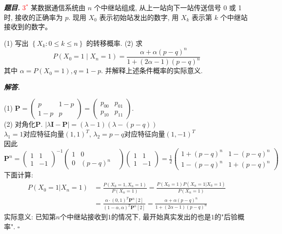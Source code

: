 \documentclass[10pt, a4paper, oneside]{ctexart}
\newenvironment{problem}{\begin{framed}\par\noindent\textbf{\textit{题目. }}}{\end{framed}\par}
\newenvironment{solution}{%
  \par\noindent\textbf{\textit{解答. }}\ignorespaces
}{%
  \hfill\ensuremath{\square}\par %
}
\begin{document}
\begin{problem}
\textcolor{red}{3$^*$} 某数据通信系统由 $n$ 个中继站组成, 从上一站向下一站传送信号 0 或 1 时, 接收的正确率为 $p$. 现用 $X_0$ 表示初始站发出的数字, 用 $X_k$ 表示第 $k$ 个中继站接收到的数字。

(1) 写出 $\left\{X_k: 0 \leqslant k \leqslant n\right\}$ 的转移概率.
(2) 求
$$
P\left(X_0=1 \mid X_n=1\right)=\frac{\alpha+\alpha(p-q)^n}{1+(2 \alpha-1)(p-q)^n}
$$
其中 $\alpha=P\left(X_0=1\right), q=1-p$. 并解释上述条件概率的实际意义.
\end{problem}

\begin{solution}
(1) $\mathbf{P}=\begin{pmatrix}
    p&1-p\\
    1-p&p
\end{pmatrix}=\begin{pmatrix}
    p_{00}&p_{01}\\p_{10}&p_{11}
\end{pmatrix}$.\\
(2) 对角化$\mathbf{P}$. $|\lambda \mathbf{I}-\mathbf{P}|=(\lambda-1)(\lambda -(p-q))$\\$\lambda_1=1$对应特征向量$(1,1)^T$, $\lambda_2=p-q$对应特征向量$(1,-1)^T$\\因此$\mathbf{P}^n=\begin{pmatrix}
    1&1\\1&-1
\end{pmatrix}^{-1}\begin{pmatrix}
    1&0&\\0&(p-q)^n
\end{pmatrix}\begin{pmatrix}
    1&1\\1&-1
\end{pmatrix}=\frac{1}{2}\begin{pmatrix}
    1+(p-q)^n&1-(p-q)^n\\1-(p-q)^n&1+(p-q)^n
\end{pmatrix}$\\
下面计算:
\begin{align*}
    P(X_0=1|X_n=1)&=\frac{P(X_0=1,X_n=1)}{P(X_n=1)}=\frac{P(X_0=1)P(X_n=1|X_0=1)}{P(X_n=1)}\\
    &=\frac{\alpha\cdot (0,1)^T\mathbf{P}^n[2]}{(1-\alpha,\alpha)^T\mathbf{P}^n[2]}=\frac{\alpha+\alpha(p-q)^n}{1+(2\alpha-1)(p-q)^n}
\end{align*}
实际意义: 已知第$n$个中继站接收到$1$的情况下, 最开始真实发出的也是$1$的"后验概率".
\end{solution}
\end{document}
